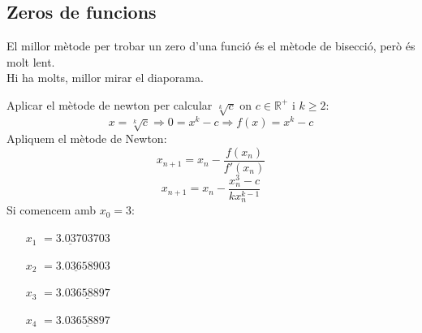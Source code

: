 \documentclass[../main.tex]{subfiles}
\begin{document}
    \subsection{Zeros de funcions}
    El millor mètode per trobar un zero d'una funció és el mètode de bisecció, però és molt lent.\\
    Hi ha molts, millor mirar el diaporama.\\
    \begin{exercici}
        Aplicar el mètode de newton per calcular $\sqrt[k]{c}$ on $c \in \mathbb{R}^+$ i $k \geq 2$:\\
        \begin{displaymath}
            x = \sqrt[k]{c} \Rightarrow 0 = x^k-c \Rightarrow f\left(x\right) = x^k-c
        \end{displaymath}
        Apliquem el mètode de Newton:
        \begin{displaymath}
            x_{n+1} = x_n - \frac{f\left(x_n\right)}{f'\left(x_n\right)}
        \end{displaymath}
        \begin{displaymath}
            x_{n+1} = x_n - \frac{x_n^3-c}{kx_n^{k-1}}
        \end{displaymath}
        Si comencem amb $x_0 = 3$:
        \begin{itemize}
            \item[$x_1$]$= 3.\underline{03}703703$
            \item[$x_2$]$= 3.\underline{0365}8903$
            \item[$x_3$]$= 3.\underline{03658897}$
            \item[$x_4$]$= 3.\underline{03658897}$
        \end{itemize}
    \end{exercici}
\end{document}
